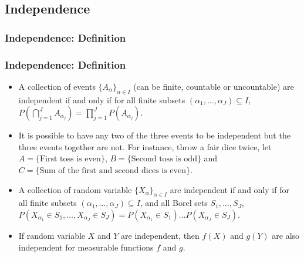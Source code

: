 \documentclass[handout]{beamer}
\begin{document}
\subsection{Independence}

\subsubsection{Independence: Definition}
\frame
{
  \frametitle{Independence: Definition}

   \begin{itemize}

             \item<1->  A collection of events $\{A_{\alpha}\}_{\alpha\in I}$ (can be finite, countable or uncountable) are independent if and only if for all finite subsets $(\alpha_1, \ldots, \alpha_J)\subseteq I$, $P(\bigcap_{j=1}^J A_{\alpha_j})=\prod_{j=1}^J P(A_{\alpha_j})$.
             
                     \item<2->[-] It is possible to have any two of the three events to be independent but the three events together are not. For instance, throw a fair dice twice, let $A=\{\text{First toss is even}\}$, $B=\{\text{Second toss is odd}\}$ and $C=\{\text{Sum of the first and second dices is even}\}$. 
           
              \item<3->  A collection of random variable $\{X_{\alpha}\}_{\alpha\in I}$ are independent if and only if for all finite subsets $(\alpha_1, \ldots, \alpha_J)\subseteq I$, and all Borel sets $S_1, \ldots, S_J$, $P(X_{\alpha_1}\in S_1, \ldots, X_{\alpha_J}\in S_J)= P(X_{\alpha_1}\in S_1)\ldots P( X_{\alpha_J}\in S_J) $. 
                                       
                                
              \item<4->  If random variable $X$ and $Y$ are independent, then $f(X)$ and $g(Y)$ are also independent for measurable functions $f$ and $g$. 
              
                           
                 \end{itemize}
}
\end{document}
